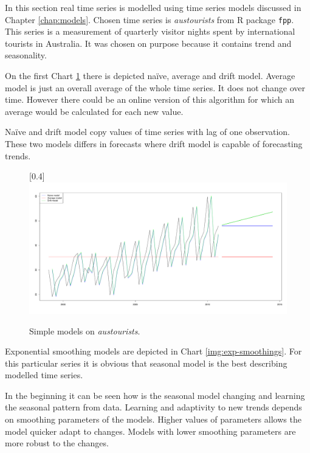     In this section real time series is modelled using time series models discussed in Chapter \ref{chap:models}.
    Chosen time series is \emph{austourists} from R package \texttt{fpp}. This series is a measurement of quarterly
    visitor nights spent by international tourists in Australia. It was chosen on purpose because it contains trend
    and seasonality.

    On the first Chart \ref{img:simple-models} there is depicted na\"{i}ve, average and drift model. Average model is
    just an overall average of the whole time series. It does not change over time. However there could be an online
    version of this algorithm for which an average would be calculated for each new value.

    Na\"{i}ve and drift model copy values of time series with lag of one observation. These two models differs in
    forecasts where drift model is capable of forecasting trends.

    \begin{figure}[H]
        \begin{center}
            \scalebox{0.255}[0.4]{\includegraphics{img/simple-models.pdf}}
            \caption{Simple models on \emph{austourists}.}
            \label{img:simple-models}
        \end{center}
    \end{figure}

    Exponential smoothing models are depicted in Chart \ref{img:exp-smoothings}. For this particular series it is
    obvious that seasonal model is the best describing modelled time series.

    In the beginning it can be seen how is the seasonal model changing and learning the seasonal pattern from data.
    Learning and adaptivity to new trends depends on smoothing parameters of the models. Higher values of parameters
    allows the model quicker adapt to changes. Models with lower smoothing parameters are more robust to the changes.

